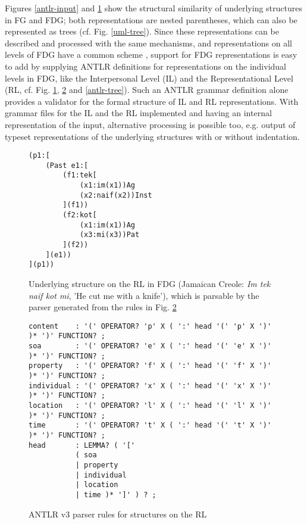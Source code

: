 \documentclass[a4paper, halfparskip, onecolumn, abstractoff, final]{scrartcl}
\begin{document}
Figures \ref{antlr-input} and \ref{fdg-rl} show the structural similarity of underlying structures in FG and FDG; both representations are nested parentheses, which can also be represented as trees (cf. Fig. \ref{uml-tree}). Since these representations can be described and processed with the same mechanisms, and representations on all levels of FDG have a common scheme \citep[671]{HengeveldAndMackenzie2006}, support for FDG representations is easy to add by supplying ANTLR definitions for representations on the individual levels in FDG, like the Interpersonal Level (IL) and the Representational Level (RL, cf. Fig. \ref{fdg-rl}, \ref{antlr-rl-parser} and \ref{antlr-tree}). Such an ANTLR grammar definition alone provides a validator for the formal structure of IL and RL representations. With grammar files for the IL and the RL implemented and having an internal representation of the input, alternative processing is possible too, e.g. output of typeset representations of the underlying structures with or without indentation.

\begin{figure}
\begin{center}
\begin{verbatim}
(p1:[ 
    (Past e1:[
        (f1:tek[
            (x1:im(x1))Ag
            (x2:naif(x2))Inst
        ](f1))
        (f2:kot[
            (x1:im(x1))Ag
            (x3:mi(x3))Pat
        ](f2))
    ](e1))
](p1))
\end{verbatim}
\caption{Underlying structure on the RL in FDG (Jamaican Creole: \emph{Im tek naif kot mi}, 'He cut me with a knife'), which is parsable by the parser generated from the rules in Fig. \ref{antlr-rl-parser}}\label{fdg-rl}  
\end{center}
\end{figure}

\begin{figure}
\begin{verbatim}
content    : '(' OPERATOR? 'p' X ( ':' head '(' 'p' X ')' )* ')' FUNCTION? ;
soa        : '(' OPERATOR? 'e' X ( ':' head '(' 'e' X ')' )* ')' FUNCTION? ;    
property   : '(' OPERATOR? 'f' X ( ':' head '(' 'f' X ')' )* ')' FUNCTION? ;    
individual : '(' OPERATOR? 'x' X ( ':' head '(' 'x' X ')' )* ')' FUNCTION? ;        
location   : '(' OPERATOR? 'l' X ( ':' head '(' 'l' X ')' )* ')' FUNCTION? ;    
time       : '(' OPERATOR? 't' X ( ':' head '(' 't' X ')' )* ')' FUNCTION? ;
head       : LEMMA? ( '[' 
           ( soa 
           | property 
           | individual 
           | location 
           | time )* ']' ) ? ;
\end{verbatim}
\caption{ANTLR v3 parser rules for structures on the RL} \label{antlr-rl-parser}
\end{figure}
\end{document}
